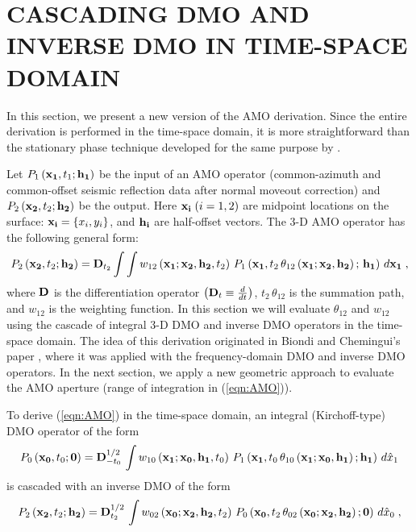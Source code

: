 \section{CASCADING DMO AND INVERSE DMO
IN TIME-SPACE DOMAIN}
In this section, we present a new version of the AMO derivation.
Since 
the entire derivation is performed in the time-space domain, it is more
straightforward than the stationary phase technique developed for the
same purpose by \cite{Biondi.sep.80.125}.
\par
Let $P_1\left({\bf x_1},t_1;{\bf h_1}\right)$ be the in\-put of an AMO
ope\-ra\-tor  (com\-mon-azi\-muth and com\-mon-off\-set seismic
reflection data after normal moveout correction) and 
$P_2\left({\bf x_2},t_2;{\bf h_2}\right)$ be the output. Here 
${\bf x_i}\; (i=1,2)$ are midpoint locations on the surface:
${\bf x_i}=\left\{x_i,y_i\right\}$, and 
${\bf h_i}$ are half-offset vectors.
The 3-D AMO operator has the following general form:
\begin{equation} 
P_2\left({\bf x_2},t_2;{\bf h_2}\right)  =  {\bf D}_{t_2} \int\int 
w_{12}\left({\bf x_1;x_2,h_2},t_2\right)\,
P_1\left({\bf x_1},
t_2\,\theta_{12}\left({\bf x_1;x_2, h_2}\right);\,
{\bf h_1}\right)\,d{\bf x_1}\;,
\label{eqn:AMO}
\end{equation}
where ${\bf D}$ is the differentiation operator $\left({\bf
D}_t\equiv{d \over dt}\right)$, $t_2\,\theta_{12}$ is the summation
path, and $w_{12}$ is the weighting function. In this section we will
evaluate $\theta_{12}$ and $w_{12}$ using the cascade of integral 3-D DMO and
inverse DMO operators in the time-space domain. The idea of this
derivation originated in Biondi and Chemingui's paper
\cite[]{Biondi.sep.80.125}, where it was  
applied with the frequency-domain DMO and inverse DMO operators. In
the next section, 
we apply a new geometric approach to evaluate the AMO aperture (range of
integration in (\ref{eqn:AMO})). 
\par
To derive (\ref{eqn:AMO}) in the time-space domain, 
an integral
(Kirchoff-type) DMO operator of the form
\begin{equation}
P_0\left({\bf x_0},t_0;{\bf 0}\right)={\bf D}_{-t_0}^{1/2}\,\int 
w_{10}\left({\bf x_1;x_0,h_1},t_0\right)\,
P_1\left({\bf x_1},t_0\,\theta_{10}\left({\bf x_1;x_0,h_1}\right);
{\bf h_1}\right)\,d\hat{x}_1
\label{eqn:DMO}
\end{equation}
is cascaded with an inverse DMO of the form
\begin{equation}
P_2\left({\bf x_2},t_2;{\bf h_2}\right)={\bf D}_{t_2}^{1/2}\,\int 
w_{02}\left({\bf x_0;x_2, h_2},t_2\right)\,
P_0\left({\bf x_0},t_2\,\theta_{02}\left({\bf x_0;x_2, h_2}\right);
{\bf 0}\right)\,d\hat{x}_0\;,
\label{eqn:IDMO}
\end{equation}
